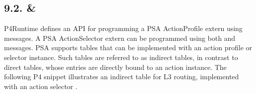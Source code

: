 \documentclass[11pt]{article}
\begin{document}
{%
\subsection{9.2.\hspace*{0.5em} \& }\label{sec-action-profile-member-and-group}%

\noindent{}P4Runtime defines an API for programming a PSA ActionProfile extern using
 messages. A PSA ActionSelector extern can be programmed
using both  and  messages. PSA supports
tables that can be implemented with an action profile or selector instance. Such
tables are referred to as indirect tables, in contrast to direct tables, whose
entries are directly bound to an action instance. The following P4 snippet
illustrates an indirect table  for L3 routing, implemented with an action
selector .%

}
\end{document}
